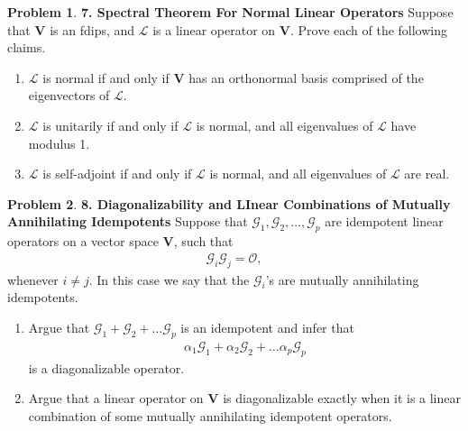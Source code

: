 \documentclass{article}
\theoremstyle{definition}
\newtheorem*{prob*}{Problem}
\newcommand{\G}{\mathcal{G}}
\newcommand{\V}{\mathbf{V}}
\newcommand{\lag}{\mathcal{L}}
\begin{document}
\begin{prob*}\textbf{7. Spectral Theorem For Normal Linear Operators} 
	Suppose that $\V$ is an fdips, and $\lag$ is a linear operator on $\V$. Prove each of the following claims.
	\begin{enumerate}
		\item $\lag$ is normal if and only if $\V$ has an orthonormal basis comprised of the eigenvectors of $\lag$. 
		\item $\lag$ is unitarily if and only if $\lag$ is normal, and all eigenvalues of $\lag$ have modulus 1. 
		\item $\lag$ is self-adjoint if and only if $\lag$ is normal, and all eigenvalues of $\lag$ are real. 
	\end{enumerate}
\end{prob*}









\newpage















\begin{prob*}\textbf{8. Diagonalizability and LInear Combinations of Mutually Annihilating Idempotents}
	Suppose that $\G_1, \G_2, \dots,\G_p$ are idempotent linear operators on a vector space $\V$, such that
	\begin{align*}
	\G_i \G_j = \mathcal{O},
	\end{align*}
	whenever $i\neq j$. In this case we say that the $\G_i$'s are mutually annihilating idempotents. 
	\begin{enumerate}
		\item Argue that $\G_1 + \G_2 + \dots \G_p$ is an idempotent and infer that 
		\begin{align*}
		\alpha_1 \G_1 + \alpha_2 \G_2 + \dots \alpha_p\G_p 
		\end{align*}
		is a diagonalizable operator. 
		
		
		\item Argue that a linear operator on $\V$ is diagonalizable exactly when it is a linear combination of some mutually annihilating idempotent operators. 
		
		
	\end{enumerate}
	
\end{prob*}
\end{document}
